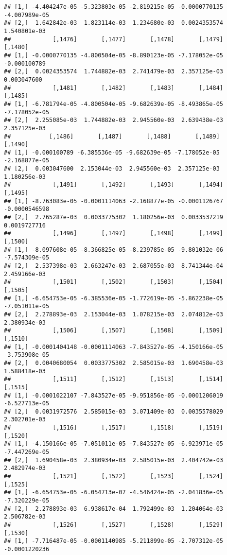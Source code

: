 \documentclass[
]{article}
\begin{document}
\begin{verbatim}
## [1,] -4.404247e-05 -5.323803e-05 -2.819215e-05 -0.0000770135 -4.007989e-05
## [2,]  1.642842e-03  1.823114e-03  1.234680e-03  0.0024353574  1.540801e-03
##            [,1476]       [,1477]       [,1478]       [,1479]      [,1480]
## [1,] -0.0000770135 -4.800504e-05 -8.890123e-05 -7.178052e-05 -0.000100789
## [2,]  0.0024353574  1.744882e-03  2.741479e-03  2.357125e-03  0.003047600
##            [,1481]       [,1482]       [,1483]       [,1484]       [,1485]
## [1,] -6.781794e-05 -4.800504e-05 -9.682639e-05 -8.493865e-05 -7.178052e-05
## [2,]  2.255085e-03  1.744882e-03  2.945560e-03  2.639438e-03  2.357125e-03
##           [,1486]       [,1487]       [,1488]       [,1489]       [,1490]
## [1,] -0.000100789 -6.385536e-05 -9.682639e-05 -7.178052e-05 -2.168877e-05
## [2,]  0.003047600  2.153044e-03  2.945560e-03  2.357125e-03  1.180256e-03
##            [,1491]       [,1492]       [,1493]       [,1494]       [,1495]
## [1,] -8.763083e-05 -0.0001114063 -2.168877e-05 -0.0001126767 -0.0000546598
## [2,]  2.765287e-03  0.0033775302  1.180256e-03  0.0033537219  0.0019727716
##            [,1496]       [,1497]       [,1498]       [,1499]       [,1500]
## [1,] -8.097608e-05 -8.366825e-05 -8.239785e-05 -9.801032e-06 -7.574309e-05
## [2,]  2.537398e-03  2.663247e-03  2.687055e-03  8.741344e-04  2.459166e-03
##            [,1501]       [,1502]       [,1503]       [,1504]       [,1505]
## [1,] -6.654753e-05 -6.385536e-05 -1.772619e-05 -5.862238e-05 -7.051011e-05
## [2,]  2.278893e-03  2.153044e-03  1.078215e-03  2.074812e-03  2.380934e-03
##            [,1506]       [,1507]       [,1508]       [,1509]       [,1510]
## [1,] -0.0001404148 -0.0001114063 -7.843527e-05 -4.150166e-05 -3.753908e-05
## [2,]  0.0040680054  0.0033775302  2.585015e-03  1.690458e-03  1.588418e-03
##            [,1511]       [,1512]       [,1513]       [,1514]       [,1515]
## [1,] -0.0001022107 -7.843527e-05 -9.951856e-05 -0.0001206019 -6.527713e-05
## [2,]  0.0031972576  2.585015e-03  3.071409e-03  0.0035578029  2.302701e-03
##            [,1516]       [,1517]       [,1518]       [,1519]       [,1520]
## [1,] -4.150166e-05 -7.051011e-05 -7.843527e-05 -6.923971e-05 -7.447269e-05
## [2,]  1.690458e-03  2.380934e-03  2.585015e-03  2.404742e-03  2.482974e-03
##            [,1521]       [,1522]       [,1523]       [,1524]       [,1525]
## [1,] -6.654753e-05 -6.054713e-07 -4.546424e-05 -2.041836e-05 -7.320229e-05
## [2,]  2.278893e-03  6.938617e-04  1.792499e-03  1.204064e-03  2.506782e-03
##            [,1526]       [,1527]       [,1528]       [,1529]       [,1530]
## [1,] -7.716487e-05 -0.0001140985 -5.211899e-05 -2.707312e-05 -0.0001220236

\end{verbatim}
\end{document}
